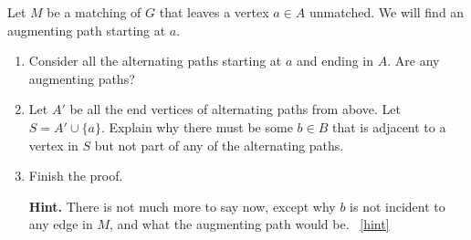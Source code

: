\documentclass{book}
\begin{document}
\setcounter{project}{60}
\addtocounter{project}{-1}
\begin{activity}[]\label{activity-53}
\hypertarget{p-480}{}%
Let \(M\) be a matching of \(G\) that leaves a vertex \(a \in A\) unmatched.  We will find an augmenting path starting at \(a\).%
\begin{enumerate}[font=\bfseries,label=(\alph*),ref=\alph*]
\item\label{task-66} \hypertarget{p-481}{}%
Consider all the alternating paths starting at \(a\) and ending in \(A\).  Are any augmenting paths?%
\item\label{task-67} \hypertarget{p-482}{}%
Let \(A'\) be all the end vertices of alternating paths from above.  Let \(S = A' \cup \{a\}\).  Explain why there must be some \(b \in B\) that is adjacent to a vertex in \(S\) but not part of any of the alternating paths.%
\item\label{task-68} \hypertarget{p-483}{}%
Finish the proof.%
\par\smallskip%
\noindent\textbf{Hint.}\hypertarget{hint-24}{}\quad%
\hypertarget{p-484}{}%
There is not much more to say now, except why \(b\) is not incident to any edge in \(M\), and what the augmenting path would be.%
~\hfill{\tiny\hyperlink{a-60.c}{[hint]}\hypertarget{q-60.c}{}}\end{enumerate}
\end{activity}
\end{document}
